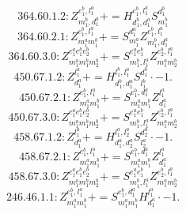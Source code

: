 \documentclass[letterpaper,10pt,fleqn,leqno,onecolumn]{article}
\begin{document}
\begin{equation} \;\;\;\;\;\;  364.60.1.2: Z^{e_{1}^{b},l_{1}^{a}}_{m_{1}^{b},d_{1}^{a}}+=H^{e_{1}^{b},l_{1}^{a}}_{d_{1}^{b},d_{1}^{a}}S^{d_{1}^{b}}_{m_{1}^{b}} \end{equation}
\begin{equation} \;\;\;\;\;\;  364.60.2.1: Z^{e_{1}^{b},l_{1}^{a}}_{m_{1}^{a}m_{1}^{b}}+=S^{d_{1}^{a}}_{m_{1}^{a}}Z^{e_{1}^{b},l_{1}^{a}}_{m_{1}^{b},d_{1}^{a}} \end{equation}
\begin{equation} \;\;\;\;\;\;  364.60.3.0: Z^{e_{1}^{a}e_{1}^{b}e_{2}^{b}}_{m_{1}^{a}m_{1}^{b}m_{2}^{b}}+=S^{e_{1}^{a}e_{1}^{b}}_{m_{1}^{b},l_{1}^{a}}Z^{e_{2}^{b},l_{1}^{a}}_{m_{1}^{a}m_{2}^{b}} \end{equation}
\begin{equation} \;\;\;\;\;\;  450.67.1.2: Z^{l_{1}^{a}}_{d_{1}^{a}}+=H^{l_{1}^{b},l_{1}^{a}}_{d_{1}^{b},d_{1}^{a}}S^{d_{1}^{b}}_{l_{1}^{b}}\cdot -1. \end{equation}
\begin{equation} \;\;\;\;\;\;  450.67.2.1: Z^{e_{1}^{b},l_{1}^{a}}_{m_{1}^{a}m_{1}^{b}}+=S^{e_{1}^{b},d_{1}^{a}}_{m_{1}^{a}m_{1}^{b}}Z^{l_{1}^{a}}_{d_{1}^{a}} \end{equation}
\begin{equation} \;\;\;\;\;\;  450.67.3.0: Z^{e_{1}^{a}e_{1}^{b}e_{2}^{b}}_{m_{1}^{a}m_{1}^{b}m_{2}^{b}}+=S^{e_{1}^{a}e_{1}^{b}}_{m_{1}^{b},l_{1}^{a}}Z^{e_{2}^{b},l_{1}^{a}}_{m_{1}^{a}m_{2}^{b}} \end{equation}
\begin{equation} \;\;\;\;\;\;  458.67.1.2: Z^{l_{1}^{a}}_{d_{1}^{a}}+=H^{l_{1}^{a},l_{2}^{a}}_{d_{1}^{a},d_{2}^{a}}S^{d_{2}^{a}}_{l_{2}^{a}}\cdot -1. \end{equation}
\begin{equation} \;\;\;\;\;\;  458.67.2.1: Z^{e_{1}^{b},l_{1}^{a}}_{m_{1}^{a}m_{1}^{b}}+=S^{e_{1}^{b},d_{1}^{a}}_{m_{1}^{a}m_{1}^{b}}Z^{l_{1}^{a}}_{d_{1}^{a}} \end{equation}
\begin{equation} \;\;\;\;\;\;  458.67.3.0: Z^{e_{1}^{a}e_{1}^{b}e_{2}^{b}}_{m_{1}^{a}m_{1}^{b}m_{2}^{b}}+=S^{e_{1}^{a}e_{1}^{b}}_{m_{1}^{b},l_{1}^{a}}Z^{e_{2}^{b},l_{1}^{a}}_{m_{1}^{a}m_{2}^{b}} \end{equation}
\begin{equation} \;\;\;\;\;\;  246.46.1.1: Z^{e_{1}^{b},l_{1}^{a}}_{m_{1}^{a}m_{1}^{b}}+=S^{e_{1}^{b},d_{1}^{a}}_{m_{1}^{a}m_{1}^{b}}H^{l_{1}^{a}}_{d_{1}^{a}}\cdot -1. \end{equation}
\end{document}
